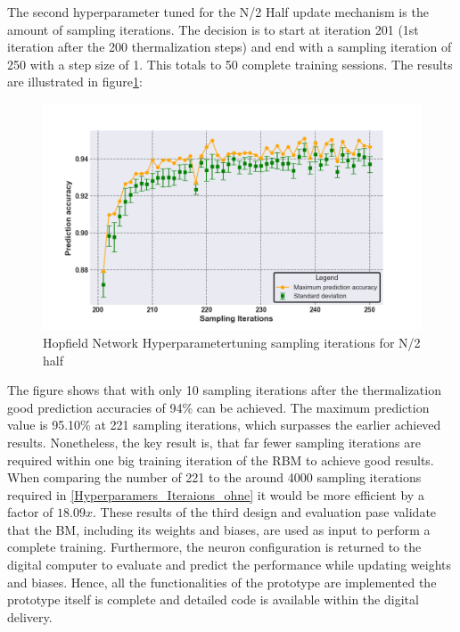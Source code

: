 The second hyperparameter tuned for the N/2 Half update mechanism is the amount of sampling iterations. 
The decision is to start at iteration 201 (1st iteration after the 200 thermalization steps) and end with a sampling iteration of 250 with a step size of 1.
This totals to 50 complete training sessions. The results are illustrated in figure\ref{Hyperparamers_Iteraions_mit}:
\begin{figure}[H]
    \centering
    \includegraphics[width=0.9\linewidth]{graphics/Iterations_MIT_N2_Half_Pred_Acc.png}
    \caption{Hopfield Network Hyperparametertuning sampling iterations for N/2 half}
    \label{Hyperparamers_Iteraions_mit}
\end{figure}
The figure shows that with only 10 sampling iterations after the thermalization good prediction accuracies of 94\% can be achieved. 
The maximum prediction value is 95.10\% at 221 sampling iterations, which surpasses the earlier achieved results.
Nonetheless, the key result is, that far fewer sampling iterations are required within one big training iteration of the \ac{RBM}
to achieve good results. 
When comparing the number of 221 to the around 4000 sampling iterations required in \ref{Hyperparamers_Iteraions_ohne} it would be more efficient by a factor of 
\(18.09x\).
These results of the third design and evaluation pase validate that the \ac{BM}, including its weights and biases, are used as 
input to perform a complete training. 
Furthermore, the neuron configuration is returned to the digital computer to evaluate and predict the performance while updating weights and biases. 
Hence, all the functionalities of the prototype are implemented the prototype itself is complete and detailed code is available within the digital delivery. 

